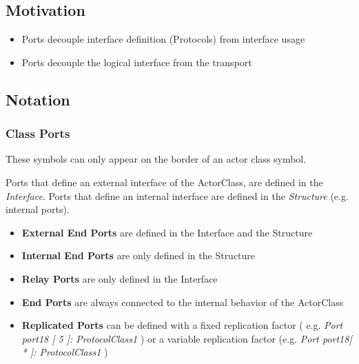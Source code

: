 \subsection{Motivation}

\begin{itemize}
\item Ports decouple interface definition (Protocols) from interface usage
\item Ports decouple the logical interface from the transport 
\end{itemize}

\subsection{Notation}

\subsubsection{Class Ports}

These symbols can only appear on the border of an actor class symbol. 

Ports that define an external interface of the ActorClass, are defined in the \textit{Interface}. Ports that define an internal interface are defined in the \textit{Structure} (e.g. internal ports).
\begin{itemize}
\item \textbf{External End Ports} are defined in the Interface and the Structure
\item \textbf{Internal End Ports} are only defined in the Structure
\item \textbf{Relay Ports} are only defined in the Interface
\item \textbf{End Ports} are always connected to the internal behavior of the ActorClass
\item \textbf{Replicated Ports} can be defined with a fixed replication factor ( e.g. \textit{Port port18 [ 5 ]: ProtocolClass1} ) or a variable replication factor (e.g. \textit{Port port18[ * ]: ProtocolClass1} )
\end{itemize}

